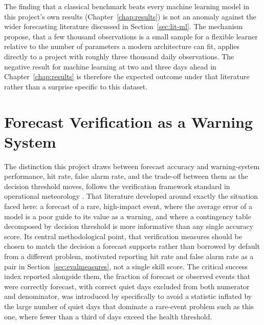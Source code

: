 \documentclass[12pt,a4paper]{report}
\begin{document}
The finding that a classical benchmark beats every machine learning model in
this project's own results (Chapter~\ref{chap:results}) is not an anomaly
against the wider forecasting literature discussed in
Section~\ref{sec:lit-ml}. The mechanism \citet{makridakis2020m4} propose,
that a few thousand observations is a small sample for a flexible learner
relative to the number of parameters a modern architecture can fit, applies
directly to a project with roughly three thousand daily observations. The
negative result for machine learning at two and three days ahead in
Chapter~\ref{chap:results} is therefore the expected outcome under that
literature rather than a surprise specific to this dataset.

\section{Forecast Verification as a Warning System}
\label{sec:verification}

The distinction this project draws between forecast accuracy and warning-system performance, hit rate, false alarm rate, and the trade-off between
them as the decision threshold moves, follows the verification framework
standard in operational meteorology \citep{jolliffe2012forecast}. That
literature developed around exactly the situation faced here: a forecast of
a rare, high-impact event, where the average error of a model is a poor
guide to its value as a warning, and where a contingency table decomposed by
decision threshold is more informative than any single accuracy score. Its
central methodological point, that verification measures should be chosen to
match the decision a forecast supports rather than borrowed by default from
a different problem, motivated reporting hit rate and false alarm rate as a
pair in Section~\ref{sec:evalmeasures}, not a single skill score. The
critical success index reported alongside them, the fraction of forecast or
observed events that were correctly forecast, with correct quiet days
excluded from both numerator and denominator, was introduced by
\citet{schaefer1990csi} specifically to avoid a statistic inflated by the
large number of quiet days that dominate a rare-event problem such as this
one, where fewer than a third of days exceed the health threshold.
\end{document}
